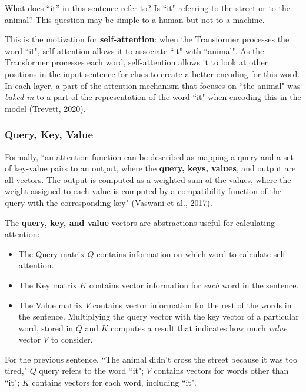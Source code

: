 What does ``it” in this sentence refer to? Is ``it" referring to the street or to the animal? This question may be simple to a human but not to a machine. 

This is the motivation for \textbf{self-attention}: when the Transformer processes the word ``it", self-attention allows it to associate ``it" with ``animal". As the Transformer processes each word, self-attention allows it to look at other positions in the input sentence for clues to create a better encoding for this word. In each layer, a part of the attention mechanism that focuses on ``the animal" was \emph{baked in} to a part of the representation of the word ``it" when encoding this in the model (Trevett, 2020). 


\subsubsection{Query, Key, Value}

Formally, ``an attention function can be described as mapping a query and a set of key-value pairs to an output, where the \textbf{query, keys, values}, and output are all vectors. The output is computed as a weighted sum of the values, where the weight assigned to each value is computed by a compatibility function of the query with the corresponding key" (Vaswani et al., 2017). 


The \textbf{query, key, and value} vectors are abstractions useful for calculating attention:
\begin{itemize}
    \item The Query matrix $Q$ contains information on which word to calculate self attention. 
    
     \item The Key matrix $K$ contains vector information for \emph{each} word in the sentence.
     
    \item The Value matrix $V$ contains vector information for the rest of the words in the sentence. Multiplying the query vector with the key vector of a particular word, stored in $Q$ and $K$ computes a result that indicates how much \emph{value} vector $V$ to consider.
\end{itemize}

For the previous sentence, ``The animal didn't cross the street because it was too tired,"  $Q$ query refers to the word ``it"; $V$ contains vectors for words other than ``it"; $K$ contains vectors for each word, including ``it".

